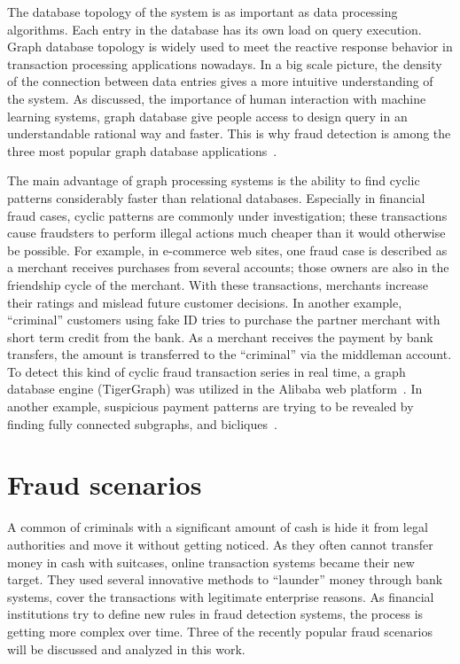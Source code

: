 The database topology of the system is as important as data processing algorithms.
Each entry in the database has its own load on query execution.
Graph database topology is widely used to meet the reactive response behavior in transaction processing applications nowadays.
In a big scale picture, the density of the connection between data entries gives a more intuitive understanding of the system.
As discussed, the importance of human interaction with machine learning systems, graph database give people access to design query in an understandable rational way and faster.
This is why fraud detection is among the three most popular graph database applications~\cite{DBLP:journals/pvldb/SahuMSLO17}.

The main advantage of graph processing systems is the ability to find cyclic patterns considerably faster than relational databases.
Especially in financial fraud cases, cyclic patterns are commonly under investigation; these transactions cause fraudsters to perform illegal actions much cheaper than it would otherwise be possible.
For example, in e-commerce web sites, one fraud case is described as a merchant receives purchases from several accounts; those owners are also in the friendship cycle of the merchant.
With these transactions, merchants increase their ratings and mislead future customer decisions.
In another example, ``criminal'' customers using fake ID tries to purchase the partner merchant with short term credit from the bank. 
As a merchant receives the payment by bank transfers, the amount is transferred to the ``criminal'' via the middleman account.
To detect this kind of cyclic fraud transaction series in real time, a graph database engine (TigerGraph) was utilized in the Alibaba web platform~\cite{DBLP:journals/pvldb/QiuCQPZLZ18}.
In another example, suspicious payment patterns are trying to be revealed by finding fully connected subgraphs, and bicliques~\cite{DBLP:conf/ieaaie/BraunCSKL17}.

\section{Fraud scenarios}

A common of criminals with a significant amount of cash is hide it from legal authorities and move it without getting noticed.
As they often cannot transfer money in cash with suitcases, online transaction systems became their new target.
They used several innovative methods to ``launder'' money through bank systems, cover the transactions with legitimate enterprise reasons.
As financial institutions try to define new rules in fraud detection systems, the process is getting more complex over time.
Three of the recently popular fraud scenarios will be discussed and analyzed in this work.

